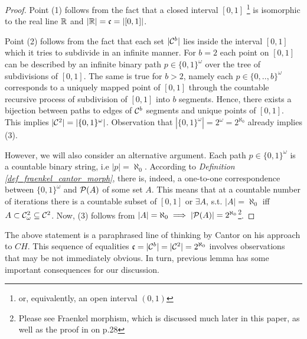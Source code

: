 \begin{proof}
  Point (1) follows from the fact that a closed interval $[0,1]$ \footnote{or, equivalently, an open interval $(0,1)$} is isomorphic to the real line $\mathbb{R}$ and $|\mathbb{R}| = \mathfrak{c} = |[0,1]|$. 

  Point (2) follows from the fact that each set $|\mathcal{C}^b|$ lies inside the interval $[0,1]$ which it tries to subdivide in an infinite manner. For $b = 2$ each point on $[0,1]$ can be described by an infinite binary path $p \in \{0,1\}^\omega$ over the tree of subdivisions of $[0,1]$. The same is true for $b > 2$, namely each $p \in \{0,..,b\}^\omega$ corresponds to a uniquely mapped point of $[0,1]$ through the countable recursive process of subdivision of $[0,1]$ into $b$ segments. Hence, there exists a bijection between paths to edges of $\mathcal{C}^b$ segments and unique points of $[0,1]$. This implies $|\mathcal{C}^2| = |\{0,1\}^\omega|$. Observation that $|\{0,1\}^\omega| = 2^\omega = 2^{\aleph_0}$ already implies (3).
  
  However, we will also consider an alternative argument. Each path $p \in \{0,1\}^\omega$ is a countable binary string, i.e $|p| = \aleph_0$. According to \textit{Definition \ref{def_fraenkel_cantor_morph}}, there is, indeed, a one-to-one correspondence between $\{0,1\}^\omega$ and $\mathcal{P}(A)$ of some set $A$. This means that at a countable number of iterations there is a countable subset of $[0,1]$ or $\exists A$, s.t. $|A|=\aleph_0$ iff $A \subset \mathcal{C}^2_\omega \subseteq \mathcal{C}^2$. Now, (3) follows from $|A| = \aleph_0 \implies |\mathcal{P}(A)| = 2^{\aleph_0}$\footnote{Please see Fraenkel morphism, which is discussed much later in this paper, as well as the proof in \cite{jech} on p.28}.
\end{proof}

The above statement is a paraphrased line of thinking by Cantor on his approach to $CH$. This sequence of equalities $\mathfrak{c} = |\mathcal{C}^b| = |\mathcal{C}^2| = 2^{\aleph_0}$ involves observations that may be not immediately obvious. In turn, previous lemma has some important consequences for our discussion.

